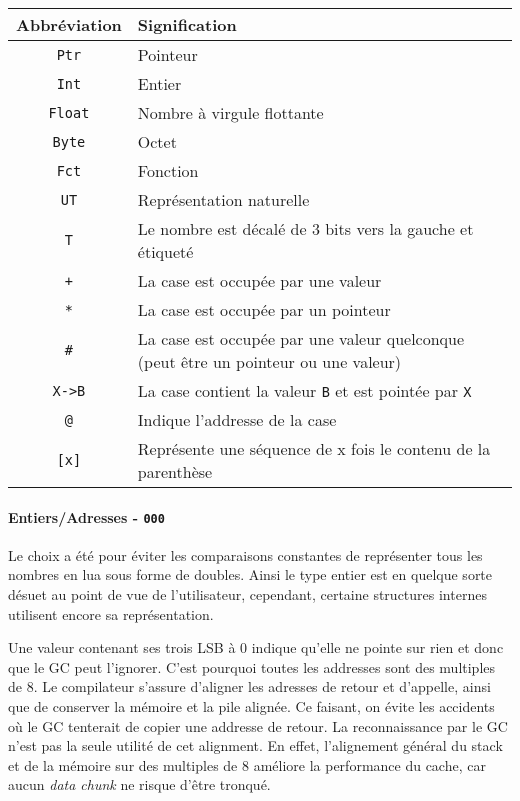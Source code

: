 \documentclass{article}
\begin{document}
\vspace{1.5cm}
\begin{center}
  \begin{tabular}{c|p{12cm}}
    \textbf{Abbréviation} & \textbf{Signification}\\
    \hline\hline
    \texttt{Ptr} & Pointeur\\
    \hline
    \texttt{Int} & Entier\\
    \hline
    \texttt{Float} & Nombre à virgule flottante\\
    \hline
    \texttt{Byte} & Octet\\
    \hline
    \texttt{Fct} & Fonction\\
    \hline
    \texttt{UT} & Représentation naturelle\\
    \hline
    \texttt{T} & Le nombre est décalé de 3 bits vers la gauche et étiqueté\\
    \hline
    \texttt{+} & La case est occupée par une valeur\\
    \hline
    \texttt{*} & La case est occupée par un pointeur\\
    \hline
    \texttt{\#{}} & La case est occupée par une valeur quelconque (peut être un pointeur ou une valeur)\\
    \hline
    \texttt{X->B} & La case contient la valeur \texttt{B} et est pointée par \texttt{X}\\
    \hline
    \texttt{@} & Indique l'addresse de la case\\
    \hline
    \texttt{[x]} & Représente une séquence de x fois le contenu de la parenthèse\\
  \end{tabular}
\end{center}
\setcounter{paragraph}{-1}

\vspace{1.5cm}

\paragraph{Entiers/Adresses - \texttt{000}}
Le choix a été pour éviter les comparaisons constantes de représenter tous les nombres en lua sous forme de doubles. Ainsi le type entier est en quelque sorte désuet au point de vue de l'utilisateur, cependant, certaine structures internes utilisent encore sa représentation.

Une valeur contenant ses trois LSB à 0 indique qu'elle ne pointe sur rien et donc que le GC peut l'ignorer. C'est pourquoi toutes les addresses sont des multiples de 8. Le compilateur s'assure d'aligner les adresses de retour et d'appelle, ainsi que de conserver la mémoire et la pile alignée. Ce faisant, on évite les accidents où le GC tenterait de copier une addresse de retour. La reconnaissance par le GC n'est pas la seule utilité de cet alignment. En effet, l'alignement général du stack et de la mémoire sur des multiples de 8 améliore la performance du cache, car aucun \textit{data chunk} ne risque d'être tronqué.
\newpage
\end{document}
